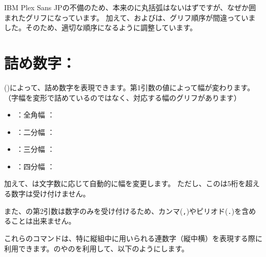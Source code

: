 \documentclass[uplatex, dvipdfmx, paper=a4paper, line_length=45zw, head_space=7zw, foot_space=10zw]{jlreq}
\begin{document}
IBM Plex Sans JPの不備のため、本来の{\ibmfamily{}}に丸括弧はないはずですが、なぜか囲まれたグリフになっています。
加えて、およびは、グリフ順序が間違っていました。そのため、適切な順序になるように調整しています。

\section{詰め数字：\texorpdfstring{}{\textbackslash ajTsumesuji}}

 ()によって、詰め数字を表現できます。第1引数の値によって幅が変わります。（字幅を変形で詰めているのではなく、対応する幅のグリフがあります）

\begin{itemize}
  \item {}：全角幅 ： {\ibmfamily {}}
  \item {}：二分幅 ： {\ibmfamily {}}
  \item {}：三分幅 ： {\ibmfamily {}}
  \item {}：四分幅 ： {\ibmfamily {}}
\end{itemize}

加えて、は文字数に応じて自動的に幅を変更します。
ただし、このは5桁を超える数字は受け付けません。

また、の第2引数は数字のみを受け付けるため、カンマ(\texttt{,})やピリオド(\texttt{.})を含めることは出来ません。

これらのコマンドは、特に縦組中に用いられる連数字（縦中横）を表現する際に利用できます。のやのを利用して、以下のようにします。
\end{document}
